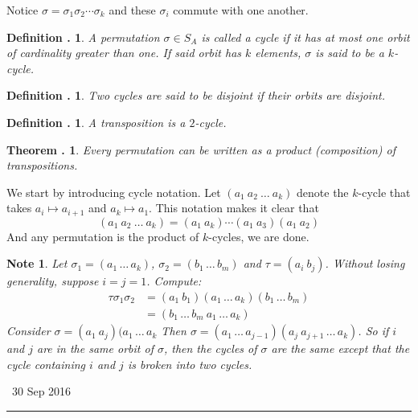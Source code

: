\documentclass[twoside]{report}
\newcounter{Lecture}
\newcommand{\newLec}[1]{
  \stepcounter{Lecture}
  \noindent{\Large\bf Lecture \arabic{Lecture}} \, #1 \hfill  \rule[1ex]{2.5in}{.1pt} \vspace{1em}
}
\theoremstyle{myts}
\newcounter{c}[Lecture]
\newtheorem{dfn}[c]{Definition \arabic{Lecture}.}
\newtheorem{thm}[c]{Theorem \arabic{Lecture}.}
\newtheorem*{nte}{Note}
\newcounter{ex}[Lecture]
\newenvironment{prf}{
  \noindent\begin{mdframed}[style=prf]}{\end{mdframed} \vspace{1em}
}
\begin{document}
\noindent
Notice \( \sigma = \sigma_1\sigma_2 \cdots \sigma_k \) and these $\sigma_i$ commute with one another.

\begin{dfn}
  A permutation \( \sigma\in S_A \) is called a \emph{cycle} if it has at most one orbit of cardinality greater than one. If said orbit has $k$ elements, $\sigma$ is said to be a \emph{$k$-cycle}.
\end{dfn}

\begin{dfn}
  Two cycles are said to be \emph{disjoint} if their orbits are disjoint.
\end{dfn}

\begin{dfn}
  A \emph{transposition} is a $2$-cycle.
\end{dfn}

\begin{thm}
  Every permutation can be  written as a product (composition) of transpositions.
\end{thm}

\begin{prf}
  We start by introducing cycle notation. Let \( ( a_1 \: a_2 \: \ldots \: a_k ) \) denote the $k$-cycle that takes \( a_i \mapsto a_{i+1} \) and \( a_k \mapsto a_1 \). This notation makes it clear that
  \[
    ( a_1 \: a_2 \: \ldots \: a_k ) = ( a_1 \: a_k )\cdots (a_1 \: a_3 ) (a_1 \: a_2)
  \]
  And any permutation is the product of $k$-cycles, we are done.
\end{prf}

\begin{nte}
  Let \( \sigma_1 = (a_1 \, \ldots \, a_k ) \), \( \sigma_2 = (b_1 \, \ldots \, b_m ) \) and \( \tau = (a_i \: b_j ) \). Without losing generality, suppose \( i = j = 1 \). Compute:
  \begin{align*}
    \tau\sigma_1\sigma_2 &= (a_1 \: b_1 ) (a_1 \, \ldots \, a_k ) (b_1 \, \ldots \, b_m) \\
      &= (b_1 \, \ldots \, b_m \: a_1 \, \ldots \, a_k )
  \end{align*}
  Consider \( \sigma = (a_1 \: a_j ) (a_1 \, \ldots \, a_k \) Then \( \sigma = (a_1 \, \ldots \, a_{j-1} ) (a_j \:  a_{j+1}\, \ldots \, a_k ) \). So if $i$ and $j$ are in the same orbit of $\sigma$, then the cycles of $\sigma$ are the same except that the cycle containing $i$ and $j$ is broken into two cycles.
\end{nte}

\newLec{30 Sep 2016}
\end{document}
